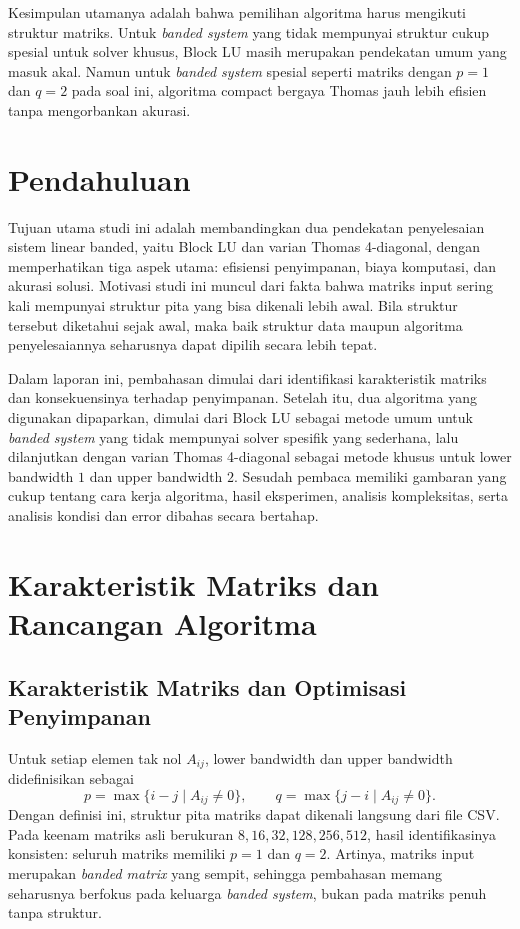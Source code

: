 \documentclass[12pt,a4paper]{article}
\begin{document}
Kesimpulan utamanya adalah bahwa pemilihan algoritma harus mengikuti struktur matriks. Untuk \emph{banded system} yang tidak mempunyai struktur cukup spesial untuk solver khusus, Block LU masih merupakan pendekatan umum yang masuk akal. Namun untuk \emph{banded system} spesial seperti matriks dengan $p=1$ dan $q=2$ pada soal ini, algoritma compact bergaya Thomas jauh lebih efisien tanpa mengorbankan akurasi.

\section{Pendahuluan}
Tujuan utama studi ini adalah membandingkan dua pendekatan penyelesaian sistem linear banded, yaitu Block LU dan varian Thomas 4-diagonal, dengan memperhatikan tiga aspek utama: efisiensi penyimpanan, biaya komputasi, dan akurasi solusi. Motivasi studi ini muncul dari fakta bahwa matriks input sering kali mempunyai struktur pita yang bisa dikenali lebih awal. Bila struktur tersebut diketahui sejak awal, maka baik struktur data maupun algoritma penyelesaiannya seharusnya dapat dipilih secara lebih tepat.

Dalam laporan ini, pembahasan dimulai dari identifikasi karakteristik matriks dan konsekuensinya terhadap penyimpanan. Setelah itu, dua algoritma yang digunakan dipaparkan, dimulai dari Block LU sebagai metode umum untuk \emph{banded system} yang tidak mempunyai solver spesifik yang sederhana, lalu dilanjutkan dengan varian Thomas 4-diagonal sebagai metode khusus untuk lower bandwidth $1$ dan upper bandwidth $2$. Sesudah pembaca memiliki gambaran yang cukup tentang cara kerja algoritma, hasil eksperimen, analisis kompleksitas, serta analisis kondisi dan error dibahas secara bertahap.

\section{Karakteristik Matriks dan Rancangan Algoritma}
\subsection{Karakteristik Matriks dan Optimisasi Penyimpanan}
Untuk setiap elemen tak nol $A_{ij}$, lower bandwidth dan upper bandwidth didefinisikan sebagai
\[
p=\max\{i-j \mid A_{ij}\neq 0\}, \qquad q=\max\{j-i \mid A_{ij}\neq 0\}.
\]
Dengan definisi ini, struktur pita matriks dapat dikenali langsung dari file CSV. Pada keenam matriks asli berukuran $8,16,32,128,256,512$, hasil identifikasinya konsisten: seluruh matriks memiliki \textbf{$p=1$} dan \textbf{$q=2$}. Artinya, matriks input merupakan \emph{banded matrix} yang sempit, sehingga pembahasan memang seharusnya berfokus pada keluarga \emph{banded system}, bukan pada matriks penuh tanpa struktur.
\end{document}
